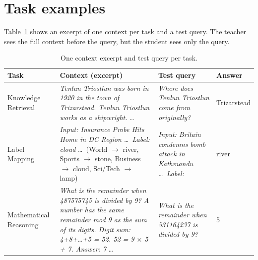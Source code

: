 \documentclass{article} %
\begin{document}
\small



\clearpage
\appendix
\normalsize

\section{Task examples}
\label{app:tasks}
Table~\ref{tab:examples} shows an excerpt of one context per task and a test query. The teacher
sees the full context before the query, but the student sees only the query.
\begin{table}[h]
  \centering\small
  \begin{tabular}{p{2.2cm}p{5.6cm}p{3.6cm}l}
    \toprule
    Task & Context (excerpt) & Test query & Answer \\
    \midrule
    Knowledge Retrieval &
    \emph{Tenlun Triostlun was born in 1920 in the town of Trizarstead. Tenlun Triostlun works as a shipwright.} \dots &
    \emph{Where does Tenlun Triostlun come from originally?} & Trizarstead \\
    \addlinespace
    Label Mapping &
    \emph{Input: Insurance Probe Hits Home in DC Region \dots\ Label: cloud} \dots\ (World $\to$ river, Sports $\to$ stone, Business $\to$ cloud, Sci/Tech $\to$ lamp) &
    \emph{Input: Britain condemns bomb attack in Kathmandu \dots\ Label:} & river \\
    \addlinespace
    Mathematical Reasoning &
    \emph{What is the remainder when 487575745 is divided by 9? A number has the same remainder mod 9 as the
    sum of its digits. Digit sum: 4+8+\dots+5 = 52. 52 = 9 $\times$ 5 + 7. Answer: 7} \dots &
    \emph{What is the remainder when 531164237 is divided by 9?} & 5 \\
    \bottomrule
  \end{tabular}
  \caption{One context excerpt and test query per task.}
  \label{tab:examples}
\end{table}
\end{document}
